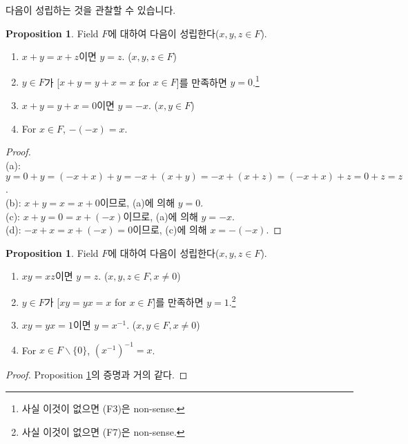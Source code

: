 \documentclass[12pt]{article}
\theoremstyle{definition}
\newtheorem{prop}[thm]{Proposition}
\begin{document}
다음이 성립하는 것을 관찰할 수 있습니다.

	\begin{prop} \label{field addition}
		Field \(F\)에 대하여 다음이 성립한다(\(x, y, z \in F\)).
		\begin{enumerate} [label=(\alph*), leftmargin=2\parindent]
			\item
			\(x + y = x + z\)이면 \(y = z\). (\(x, y, z \in F\))
			\item
			\(y \in F\)가 [\(x + y = y + x = x\) for \(x \in F\)]를 만족하면 \(y = 0\).\footnote{사실 이것이 없으면 (F3)은 non-sense.}
			\item
			\(x + y = y + x = 0\)이면 \(y = -x\). (\(x, y \in F\))
			\item
			For \(x \in F\), \(-(-x) = x\).
		\end{enumerate}
	\end{prop}
	\begin{proof}
		\quad\\
		(a): \(y = 0 + y = (-x + x) + y = -x + (x + y) = -x + (x + z) = (-x + x) + z = 0 + z = z\).\\
		(b): \(x + y = x = x + 0\)이므로, (a)에 의해 \(y=0\).\\
		(c): \(x + y = 0 = x + (-x)\)이므로, (a)에 의해 \(y = -x\).\\
		(d): \(-x + x = x + (-x) = 0\)이므로, (c)에 의해 \(x = -(-x)\).
	\end{proof}

	\begin{prop} \label{field mult}
		Field \(F\)에 대하여 다음이 성립한다(\(x, y, z \in F\)).
		\begin{enumerate} [label=(\alph*), leftmargin=2\parindent]
			\item
			\(xy = xz\)이면 \(y = z\). (\(x, y, z \in F, x \neq 0\))
			\item
			\(y \in F\)가 [\(xy = yx = x\) for \(x \in F\)]를 만족하면 \(y = 1\).\footnote{사실 이것이 없으면 (F7)은 non-sense.}
			\item
			\(xy = yx = 1\)이면 \(y = x^{-1}\). (\(x, y \in F, x \neq 0\))
			\item
			For \(x \in F \backslash \{0\}\), \((x^{-1})^{-1} = x\).
		\end{enumerate}
	\end{prop}
	\begin{proof}
		Proposition \ref{field addition}의 증명과 거의 같다.
	\end{proof}
\end{document}
